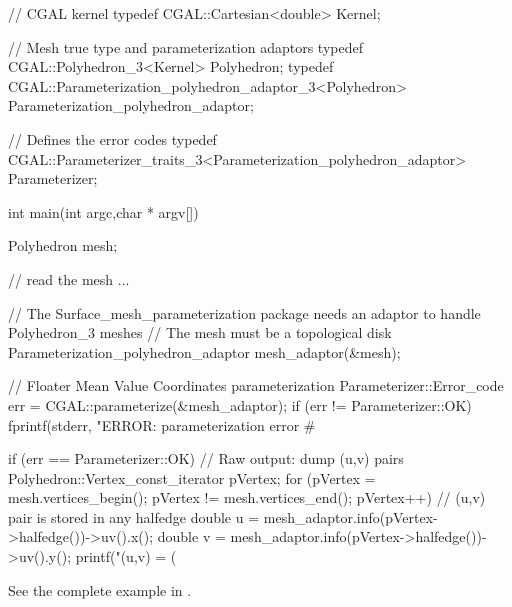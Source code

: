 \begin{ccExampleCode}

// CGAL kernel
typedef CGAL::Cartesian<double>                         Kernel;

// Mesh true type and parameterization adaptors
typedef CGAL::Polyhedron_3<Kernel>                      Polyhedron;
typedef CGAL::Parameterization_polyhedron_adaptor_3<Polyhedron>
                                                        Parameterization_polyhedron_adaptor;

// Defines the error codes
typedef CGAL::Parameterizer_traits_3<Parameterization_polyhedron_adaptor>
                                                        Parameterizer;

int main(int argc,char * argv[])
{
    Polyhedron mesh;

    // read the mesh
    ...

    // The Surface_mesh_parameterization package needs an adaptor to handle Polyhedron_3 meshes
    // The mesh must be a topological disk
    Parameterization_polyhedron_adaptor mesh_adaptor(&mesh);

    // Floater Mean Value Coordinates parameterization
    Parameterizer::Error_code err = CGAL::parameterize(&mesh_adaptor);
    if (err != Parameterizer::OK)
        fprintf(stderr, "\nFATAL ERROR: parameterization error # %

    if (err == Parameterizer::OK)
    {
        // Raw output: dump (u,v) pairs
        Polyhedron::Vertex_const_iterator pVertex;
        for (pVertex = mesh.vertices_begin();
            pVertex != mesh.vertices_end();
            pVertex++)
        {
            // (u,v) pair is stored in any halfedge
            double u = mesh_adaptor.info(pVertex->halfedge())->uv().x();
            double v = mesh_adaptor.info(pVertex->halfedge())->uv().y();
            printf("(u,v) = (%
        }
    }
}

\end{ccExampleCode}

See the complete example in .


